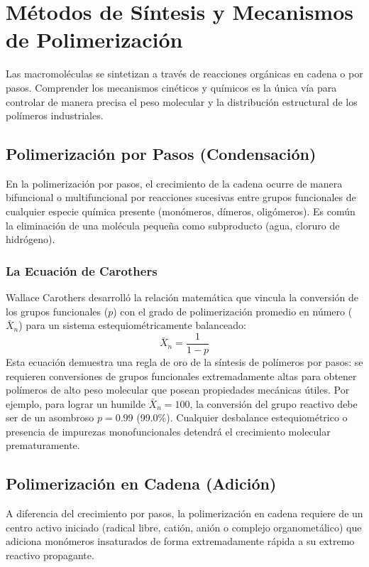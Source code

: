 \chapter{Métodos de Síntesis y Mecanismos de Polimerización}
\label{cap:sintesis}

Las macromoléculas se sintetizan a través de reacciones orgánicas en cadena o por pasos. Comprender los mecanismos cinéticos y químicos es la única vía para controlar de manera precisa el peso molecular y la distribución estructural de los polímeros industriales.

\section{Polimerización por Pasos (Condensación)}

En la polimerización por pasos, el crecimiento de la cadena ocurre de manera bifuncional o multifuncional por reacciones sucesivas entre grupos funcionales de cualquier especie química presente (monómeros, dímeros, oligómeros). Es común la eliminación de una molécula pequeña como subproducto (agua, cloruro de hidrógeno).

\subsection{La Ecuación de Carothers}
Wallace Carothers \cite{carothers1929} desarrolló la relación matemática que vincula la conversión de los grupos funcionales ($p$) con el grado de polimerización promedio en número ($\bar{X}_n$) para un sistema estequiométricamente balanceado:
\begin{equation}
    \bar{X}_n = \frac{1}{1 - p}
    \label{eq:carothers}
\end{equation}
Esta ecuación demuestra una regla de oro de la síntesis de polímeros por pasos: se requieren conversiones de grupos funcionales extremadamente altas para obtener polímeros de alto peso molecular que posean propiedades mecánicas útiles. Por ejemplo, para lograr un humilde $\bar{X}_n = 100$, la conversión del grupo reactivo debe ser de un asombroso $p = 0.99$ (99.0\%). Cualquier desbalance estequiométrico o presencia de impurezas monofuncionales detendrá el crecimiento molecular prematuramente.

\section{Polimerización en Cadena (Adición)}

A diferencia del crecimiento por pasos, la polimerización en cadena requiere de un centro activo iniciado (radical libre, catión, anión o complejo organometálico) que adiciona monómeros insaturados de forma extremadamente rápida a su extremo reactivo propagante.

